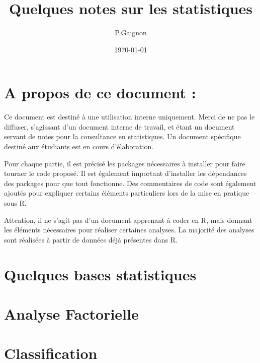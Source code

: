 \documentclass[
]{article}
\title{Quelques notes sur les statistiques}
\author{P.Gaignon}
\date{\today}
\begin{document}
\maketitle

{
\setcounter{tocdepth}{4}
\tableofcontents
}
\pagebreak

\listoffigures

\section*{A propos de ce document :}

Ce document est destiné à une utilisation interne uniquement. Merci de
ne pas le diffuser, s'agissant d'un document interne de travail, et
étant un document servant de notes pour la consultance en statistiques.
Un document spécifique destiné aux étudiants est en cours d'élaboration.

Pour chaque partie, il est précisé les packages nécessaires à installer
pour faire tourner le code proposé. Il est également important
d'installer les dépendances des packages pour que tout fonctionne. Des
commentaires de code sont également ajoutés pour expliquer certains
éléments particuliers lors de la mise en pratique sous R.

Attention, il ne s'agit pas d'un document apprenant à coder en R, mais
donnant les éléments nécessaires pour réaliser certaines analyses. La
majorité des analyses sont réalisées à partir de données déjà présentes
dans R.

\pagebreak

\hypertarget{quelques-bases-statistiques}{%
\section{Quelques bases
statistiques}\label{quelques-bases-statistiques}}

\pagebreak

\hypertarget{analyse-factorielle}{%
\section{Analyse Factorielle}\label{analyse-factorielle}}

\pagebreak

\hypertarget{classification}{%
\section{Classification}\label{classification}}
\end{document}
